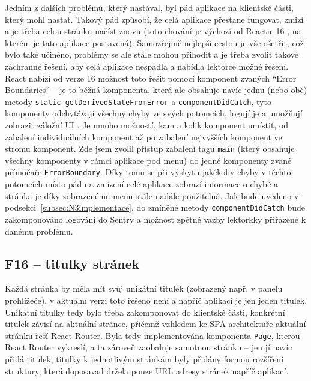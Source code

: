 Jedním z dalších problémů, který nastával, byl pád aplikace na klientské části, který mohl nastat. Takový pád způsobí, že celá aplikace přestane fungovat, zmizí a je třeba celou stránku načíst znovu (toto chování je výchozí od Reactu~16 \cite{react-errorboundaries}, na kterém je tato aplikace postavená). Samozřejmě nejlepší cestou je vše ošetřit, což bylo také učiněno, problémy se ale stále mohou přihodit a je třeba zvolit takové záchranné řešení, aby celá aplikace nespadla a nabídla lektorce možné řešení. React nabízí od verze 16 možnost toto řešit pomocí komponent zvaných \enquote{Error Boundaries} -- je to běžná komponenta, která ale obsahuje navíc jednu (nebo obě) metody \verb|static getDerivedStateFromError| a \verb|componentDidCatch|, tyto komponenty odchytávají všechny chyby ve svých potomcích, logují je a umožňují zobrazit záložní UI \cite{react-errorboundaries}. Je mnoho možností, kam a kolik komponent umístit, od zabalení individuálních komponent až po zabalení nejvyšších komponent ve stromu komponent. Zde jsem zvolil přístup zabalení tagu \verb|main| (který obsahuje všechny komponenty v rámci aplikace pod menu) do jedné komponenty zvané přímočaře \verb|ErrorBoundary|. Díky tomu se při výskytu jakékoliv chyby v těchto potomcích místo pádu a zmizení celé aplikace zobrazí informace o chybě a stránka je díky zobrazenému menu stále nadále použitelná. Jak bude uvedeno v podsekci~\ref{subsec:N3implementace}, do zmíněné metody \verb|componentDidCatch| bude zakomponováno logování do Sentry a možnost zpětné vazby lektorkky přiřazené k danému problému.

\subsection{F16 -- titulky stránek}

Každá stránka by měla mít svůj unikátní titulek (zobrazený např. v panelu prohlížeče), v aktuální verzi toto řešeno není a napříč aplikací je jen jeden titulek. Unikátní titulky tedy bylo třeba zakomponovat do klientské části, konkrétní titulek závisí na aktuální stránce, přičemž vzhledem ke SPA architektuře aktuální stránku řeší React Router. Byla tedy implementována komponenta \verb|Page|, kterou React Router vykreslí, a ta zároveň zaobaluje samotnou stránku -- jen jí navíc přidá titulek, titulky k jednotlivým stránkám byly přidány formou rozšíření struktury, která doposavad držela pouze URL adresy stránek napříč aplikací.

